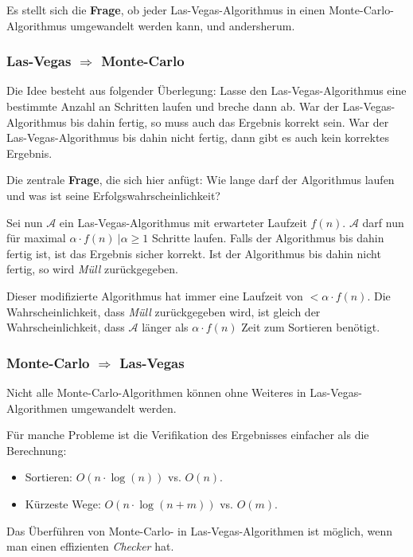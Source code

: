 \documentclass{scrartcl}%
\begin{document}
    Es stellt sich die \textbf{Frage}, ob jeder Las-Vegas-Algorithmus in einen Monte-Carlo-Algorithmus umgewandelt werden kann, und andersherum.

    \subsubsection*{Las-Vegas $\Rightarrow$ Monte-Carlo}
    Die Idee besteht aus folgender Überlegung: Lasse den Las-Vegas-Algorithmus eine bestimmte Anzahl an Schritten laufen und breche dann ab.
    War der Las-Vegas-Algorithmus bis dahin fertig, so muss auch das Ergebnis korrekt sein.
    War der Las-Vegas-Algorithmus bis dahin nicht fertig, dann gibt es auch kein korrektes Ergebnis.

    Die zentrale \textbf{Frage}, die sich hier anfügt: Wie lange darf der Algorithmus laufen und was ist seine Erfolgswahrscheinlichkeit?

    Sei nun $\mathcal{A}$ ein Las-Vegas-Algorithmus mit erwarteter Laufzeit $f(n)$.
    $\mathcal{A}$ darf nun für maximal $\alpha \cdot f(n)\ | \alpha \geq 1$ Schritte laufen.
    Falls der Algorithmus bis dahin fertig ist, ist das Ergebnis sicher korrekt.
    Ist der Algorithmus bis dahin nicht fertig, so wird \textit{Müll} zurückgegeben.

    Dieser modifizierte Algorithmus hat immer eine Laufzeit von $< \alpha \cdot f(n)$.
    Die Wahrscheinlichkeit, dass \textit{Müll} zurückgegeben wird, ist gleich der Wahrscheinlichkeit,
    dass $\mathcal{A}$ länger als $\alpha \cdot f(n)$ Zeit zum Sortieren benötigt.

    \subsubsection*{Monte-Carlo $\Rightarrow$ Las-Vegas}

    Nicht alle Monte-Carlo-Algorithmen können ohne Weiteres in Las-Vegas-Algorithmen umgewandelt werden.

    Für manche Probleme ist die Verifikation des Ergebnisses einfacher als die Berechnung:
    \begin{itemize}
        \item Sortieren: $O(n \cdot \log(n))$ \quad vs. \quad $O(n)$.
        \item Kürzeste Wege: $O(n \cdot \log(n+m))$ \quad vs. \quad $O(m)$.
    \end{itemize}

    Das Überführen von Monte-Carlo- in Las-Vegas-Algorithmen ist möglich, wenn man einen effizienten \textit{Checker} hat.
\end{document}
